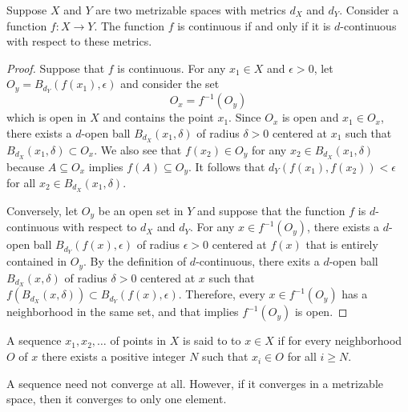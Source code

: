 \begin{theorem}
Suppose $X$ and $Y$ are two metrizable spaces with metrics $d_X$ and $d_Y$.
Consider a function $f  \colon X \rightarrow Y$.
The function $f$ is continuous if and only if it is $d$-continuous with respect to these metrics.
\end{theorem}
\begin{proof}
Suppose that $f$ is continuous.
For any $x_1 \in X$ and $\epsilon > 0$, let $O_y =  B_{d_Y} (f(x_1), \epsilon)$ and consider the set
\begin{equation*}
O_x = f^{-1} \left( O_y \right)
\end{equation*}
which is open in $X$ and contains the point $x_1$.
Since $O_x$ is open and $x_1 \in O_x$, there exists a $d$-open ball $B_{d_X} (x_1, \delta)$ of radius $\delta>0$ centered at $x_1$ such that $B_{d_X} (x_1, \delta) \subset O_x$.
We also see that $f(x_2) \in O_y$ for any $x_2 \in B_{d_X} (x_1, \delta)$ because $A \subseteq O_x$ implies $f(A) \subseteq O_y$.
It follows that $d_Y \left( f(x_1), f(x_2) \right) < \epsilon$ for all $x_2 \in B_{d_X} (x_1, \delta)$.

Conversely, let $O_y$ be an open set in $Y$ and suppose that the function $f$ is $d$-continuous with respect to $d_X$ and $d_Y$.
For any $x \in f^{-1} (O_y)$, there exists a $d$-open ball $B_{d_Y} (f(x), \epsilon)$ of radius $\epsilon>0$ centered at $f(x)$ that is entirely contained in $O_y$.
By the definition of $d$-continuous, there exits a $d$-open ball $B_{d_X} (x, \delta)$ of radius $\delta>0$ centered at $x$ such that $f \left( B_{d_X} (x,\delta) \right) \subset B_{d_Y} \left( f(x), \epsilon \right)$.
Therefore, every $x \in f^{-1}(O_y)$ has a neighborhood in the same set, and that implies $f^{-1} (O_y)$ is open.
\end{proof}

\begin{definition} \label{definition:SequenceConvergence}
A sequence $x_1, x_2, \ldots$ of points in $X$ is said to  to $x \in X$ if for every neighborhood $O$ of $x$ there exists a positive integer $N$ such that $x_i \in O$ for all $i \geq N$.
\end{definition}

A sequence need not converge at all.
However, if it converges in a metrizable space, then it converges to only one element.


